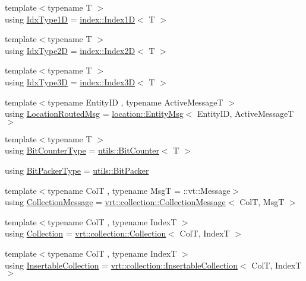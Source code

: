 \begin{DoxyCompactItemize}
{\footnotesize template$<$typename T $>$ }\\using \hyperlink{namespacevt_a36127c6500f2311908c959be653da40e}{Idx\+Type1D} = \hyperlink{namespacevt_1_1index_a091a4f5a7a2c993d9727eaa60cf67d81}{index\+::\+Index1D}$<$ T $>$
\item 
{\footnotesize template$<$typename T $>$ }\\using \hyperlink{namespacevt_ab0fbc5ddf69b5aa0ed6a8d1658b504eb}{Idx\+Type2D} = \hyperlink{namespacevt_1_1index_a8373801efc8343f24d6e8ba57df40a69}{index\+::\+Index2D}$<$ T $>$
\item 
{\footnotesize template$<$typename T $>$ }\\using \hyperlink{namespacevt_a65e4a83c0567ecb7a54b78e9b8e7d7ab}{Idx\+Type3D} = \hyperlink{namespacevt_1_1index_a2c09a09f7346d370a0bcbbfb0d4459cd}{index\+::\+Index3D}$<$ T $>$
\item 
{\footnotesize template$<$typename Entity\+ID , typename Active\+MessageT $>$ }\\using \hyperlink{namespacevt_a0cb65f2151629893480ef391def4e733}{Location\+Routed\+Msg} = \hyperlink{structvt_1_1location_1_1_entity_msg}{location\+::\+Entity\+Msg}$<$ Entity\+ID, Active\+MessageT $>$
\item 
{\footnotesize template$<$typename T $>$ }\\using \hyperlink{namespacevt_a34b3eb2eea8db3cf4ae27ced35b19b46}{Bit\+Counter\+Type} = \hyperlink{structvt_1_1utils_1_1_bit_counter}{utils\+::\+Bit\+Counter}$<$ T $>$
\item 
using \hyperlink{namespacevt_a80d5091925c65efd88ca7f49fe1d633b}{Bit\+Packer\+Type} = \hyperlink{structvt_1_1utils_1_1_bit_packer}{utils\+::\+Bit\+Packer}
\item 
{\footnotesize template$<$typename ColT , typename MsgT  = \+::vt\+::\+Message$>$ }\\using \hyperlink{namespacevt_ae7700e12f79c0fec16964aab84838428}{Collection\+Message} = \hyperlink{structvt_1_1vrt_1_1collection_1_1_collection_message}{vrt\+::collection\+::\+Collection\+Message}$<$ ColT, MsgT $>$
\item 
{\footnotesize template$<$typename ColT , typename IndexT $>$ }\\using \hyperlink{namespacevt_ac72e048964e4bb536faaa8bc90f58db7}{Collection} = \hyperlink{structvt_1_1vrt_1_1collection_1_1_collection}{vrt\+::collection\+::\+Collection}$<$ ColT, IndexT $>$
\item 
{\footnotesize template$<$typename ColT , typename IndexT $>$ }\\using \hyperlink{namespacevt_a7ffafd5682603cf80b1874f83cc7234f}{Insertable\+Collection} = \hyperlink{structvt_1_1vrt_1_1collection_1_1_insertable_collection}{vrt\+::collection\+::\+Insertable\+Collection}$<$ ColT, IndexT $>$

\end{DoxyCompactItemize}
